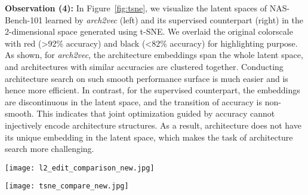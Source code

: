\textbf{Observation (4):} 
In Figure~\ref{fig:tsne}, we visualize the latent spaces of NAS-Bench-101 learned by \textit{arch2vec} (left) and its supervised counterpart (right) in the 2-dimensional space generated using t-SNE. We overlaid the original colorscale with red (>92\% accuracy) and black (<82\% accuracy) for highlighting purpose.
As shown, for \textit{arch2vec}, the architecture embeddings span the whole latent space, and architectures with similar accuracies are clustered together. 
Conducting architecture search on such smooth performance surface is much easier and is hence more efficient. 
In contrast, for the supervised counterpart, the embeddings are discontinuous in the latent space, and the transition of accuracy is non-smooth. This indicates that joint optimization guided by accuracy cannot injectively encode architecture structures. As a result, architecture does not have its unique embedding in the latent space, which makes the task of architecture search more challenging.

\begin{figure*}[t]
    \centering
    \begin{minipage}[ht]{0.45\textwidth}
    \vspace{3.5mm}
    \texttt{[image: l2\_edit\_comparison\_new.jpg]}
    \caption{Comparing distribution of L2 distance between architecture pairs by edit distance on NAS-Bench-101, measured by 1,000 architectures sampled in a long random walk with 1 edit distance apart from consecutive samples. left: \textit{arch2vec}. right: supervised architecture representation learning.}
\label{fig:l2_edit_correlation}
    \end{minipage}
    \hspace{0.1cm}
    \begin{minipage}[ht]{0.5\textwidth}
    \centering
    \texttt{[image: tsne\_compare\_new.jpg]}
    \caption{Latent space 2D visualization \cite{vanDerMaaten2008} comparison between \textit{arch2vec} (left) and supervised architecture representation learning (right) on NAS-Bench-101. Color encodes test accuracy. We randomly sample  points and average the accuracy in each small area.}
    \label{fig:tsne}
    \end{minipage}
    \vspace{-4mm}
\end{figure*}

